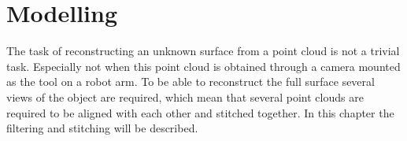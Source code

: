 \chapter{Modelling}
The task of reconstructing an unknown surface from a point cloud is not a trivial task. Especially not when this point cloud is obtained through a camera mounted as the tool on a robot arm. To be able to reconstruct the full surface several views of the object are required, which mean that several point clouds are required to be aligned with each other and stitched together. In this chapter the filtering and stitching will be described.


%